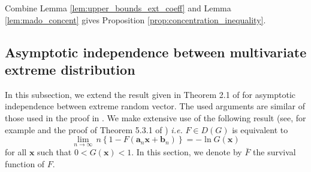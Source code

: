\documentclass[11pt]{article}
\begin{document}
	Combine Lemma \ref{lem:upper_bounds_ext_coeff} and Lemma \ref{lem:mado_concent} gives Proposition \ref{prop:concentration_inequality}.
	
	\subsection{Asymptotic independence between multivariate extreme distribution}
	\label{subsec:asympto_indep}
	In this subsection, we extend the result given in Theorem 2.1 of \cite{takahashi1994asymptotic} for asymptotic independence between extreme random vector. The used arguments are similar of those used in the proof in \cite{takahashi1994asymptotic}. We make extensive use of the following result (see, for example \cite{10.1214/aop/1176993666} and the proof of Theorem 5.3.1 of \cite{galambos1978asymptotic}) \emph{i.e.} $F \in D(G)$ is equivalent to
	\begin{equation}
		\label{eq:app_galambos}
		\underset{n \rightarrow \infty}{\lim} \, n \left\{ 1 - F(\textbf{a}_n \textbf{x} + \textbf{b}_n) \right\} = - \ln G(\textbf{x})
	\end{equation}
	for all $\textbf{x}$ such that $0<G(\textbf{x}) <1$. In this section, we denote by $\bar{F}$ the survival function of $F$.
	
\end{document}
